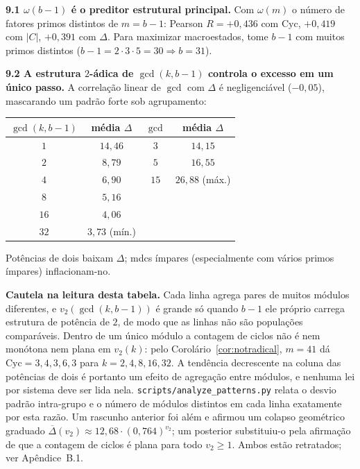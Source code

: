 \documentclass[11pt]{article}
\theoremstyle{definition}
\theoremstyle{remark}
\newcommand{\Cyc}{\mathrm{Cyc}}
\begin{document}
\noindent\textbf{9.1 $\omega(b-1)$ é o preditor estrutural principal.} Com $\omega(m)$ o número de fatores primos distintos de $m = b-1$: Pearson $R = +0{,}436$ com $\Cyc$, $+0{,}419$ com $|C|$, $+0{,}391$ com $\Delta$. Para maximizar macroestados, tome $b-1$ com muitos primos distintos ($b-1 = 2\cdot3\cdot5 = 30 \Rightarrow b = 31$).

\medskip
\noindent\textbf{9.2 A estrutura $2$-ádica de $\gcd(k, b-1)$ controla o excesso em um único passo.} A correlação linear de $\gcd$ com $\Delta$ é negligenciável ($-0{,}05$), mascarando um padrão forte sob agrupamento:

\begin{center}
\begin{tabular}{@{}cc@{\qquad}cc@{}}
\toprule
$\gcd(k,b-1)$ & média $\Delta$ & $\gcd$ & média $\Delta$ \\
\midrule
$1$ & $14{,}46$ & $3$ & $14{,}15$ \\
$2$ & $8{,}79$ & $5$ & $16{,}55$ \\
$4$ & $6{,}90$ & $15$ & $26{,}88$ (máx.) \\
$8$ & $5{,}16$ & & \\
$16$ & $4{,}06$ & & \\
$32$ & $3{,}73$ (mín.) & & \\
\bottomrule
\end{tabular}
\end{center}

Potências de dois baixam $\Delta$; mdcs ímpares (especialmente com vários primos ímpares) inflacionam-no.

\textbf{Cautela na leitura desta tabela.} Cada linha agrega pares de muitos módulos diferentes, e $v_2(\gcd(k,b-1))$ é grande só quando $b-1$ ele próprio carrega estrutura de potência de $2$, de modo que as linhas não são populações comparáveis. Dentro de um único módulo a contagem de ciclos não é nem monótona nem plana em $v_2(k)$: pelo Corolário~\ref{cor:notradical}, $m=41$ dá $\Cyc = 3, 4, 3, 6, 3$ para $k = 2, 4, 8, 16, 32$. A tendência decrescente na coluna das potências de dois é portanto um efeito de agregação entre módulos, e nenhuma lei por sistema deve ser lida nela. \texttt{scripts/analyze\_patterns.py} relata o desvio padrão intra-grupo e o número de módulos distintos em cada linha exatamente por esta razão. Um rascunho anterior foi além e afirmou um colapso geométrico graduado $\overline{\Delta}(v_2) \approx 12{,}68 \cdot (0{,}764)^{v_2}$; um posterior substituiu-o pela afirmação de que a contagem de ciclos é plana para todo $v_2 \ge 1$. Ambos estão retratados; ver Apêndice~B.1.
\end{document}
